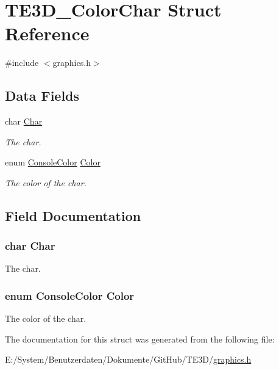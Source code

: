 \hypertarget{struct_t_e3_d___color_char}{\section{T\-E3\-D\-\_\-\-Color\-Char Struct Reference}
\label{struct_t_e3_d___color_char}
}


{\ttfamily \#include $<$graphics.\-h$>$}

\subsection*{Data Fields}
\begin{DoxyCompactItemize}
\item 
char \hyperlink{struct_t_e3_d___color_char_a4b411cdaaf0d90763eeecd4ea2e60761}{Char}
\begin{DoxyCompactList}\small\item\em The char. \end{DoxyCompactList}\item 
enum \hyperlink{console_8h_a821042d5f30537f776ce823c5d66aada}{Console\-Color} \hyperlink{struct_t_e3_d___color_char_aad8540961ff9f2e5456c8e4ab2f47ab2}{Color}
\begin{DoxyCompactList}\small\item\em The color of the char. \end{DoxyCompactList}\end{DoxyCompactItemize}


\subsection{Field Documentation}
\hypertarget{struct_t_e3_d___color_char_a4b411cdaaf0d90763eeecd4ea2e60761}{
\subsubsection[{Char}]{\setlength{\rightskip}{0pt plus 5cm}char Char}}\label{struct_t_e3_d___color_char_a4b411cdaaf0d90763eeecd4ea2e60761}


The char. 

\hypertarget{struct_t_e3_d___color_char_aad8540961ff9f2e5456c8e4ab2f47ab2}{
\subsubsection[{Color}]{\setlength{\rightskip}{0pt plus 5cm}enum {\bf Console\-Color} Color}}\label{struct_t_e3_d___color_char_aad8540961ff9f2e5456c8e4ab2f47ab2}


The color of the char. 



The documentation for this struct was generated from the following file\-:\begin{DoxyCompactItemize}
\item 
E\-:/\-System/\-Benutzerdaten/\-Dokumente/\-Git\-Hub/\-T\-E3\-D/\hyperlink{graphics_8h}{graphics.\-h}\end{DoxyCompactItemize}
